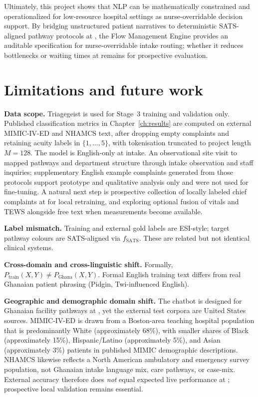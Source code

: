 Ultimately, this project shows that NLP can be mathematically constrained and operationalized for low-resource hospital settings as nurse-overridable decision support. By bridging unstructured patient narratives to deterministic SATS-aligned pathway protocols at \examplehospital{}, the Flow Management Engine provides an auditable specification for nurse-overridable intake routing; whether it reduces bottlenecks or waiting times at \examplehospital{} remains for prospective evaluation.

\section{Limitations and future work}

\textbf{Data scope.} Triagegeist is used for Stage~3 training and validation only. Published classification metrics in Chapter~\ref{ch:results} are computed on external MIMIC-IV-ED and NHAMCS text, after dropping empty complaints and retaining acuity labels in \(\{1,\ldots,5\}\), with tokenisation truncated to project length \(M=128\). The model is English-only at intake. An observational site visit to \examplehospital{} mapped pathways and department structure through intake observation and staff inquiries; supplementary English example complaints generated from those protocols support prototype and qualitative analysis only and were not used for fine-tuning. A natural next step is prospective collection of locally labeled chief complaints at \examplehospital{} for local retraining, and exploring optional fusion of vitals and TEWS alongside free text when measurements become available.

\textbf{Label mismatch.} Training and external gold labels are ESI-style; target pathway colours are SATS-aligned via \(f_{\mathrm{SATS}}\). These are related but not identical clinical systems.

\textbf{Cross-domain and cross-linguistic shift.} Formally, \(P_{\mathrm{train}}(X,Y)\neq P_{\mathrm{Ghana}}(X,Y)\). Formal English training text differs from real Ghanaian patient phrasing (Pidgin, Twi-influenced English).

\textbf{Geographic and demographic domain shift.} The chatbot is designed for Ghanaian facility pathways at \examplehospital{}, yet the external test corpora are United States sources. MIMIC-IV-ED is drawn from a Boston-area teaching hospital population that is predominantly White (approximately 68\%), with smaller shares of Black (approximately 15\%), Hispanic/Latino (approximately 5\%), and Asian (approximately 3\%) patients in published MIMIC demographic descriptions. NHAMCS likewise reflects a North American ambulatory and emergency survey population, not Ghanaian intake language mix, care pathways, or case-mix. External accuracy therefore does \emph{not} equal expected live performance at \examplehospital{}; prospective local validation remains essential.

